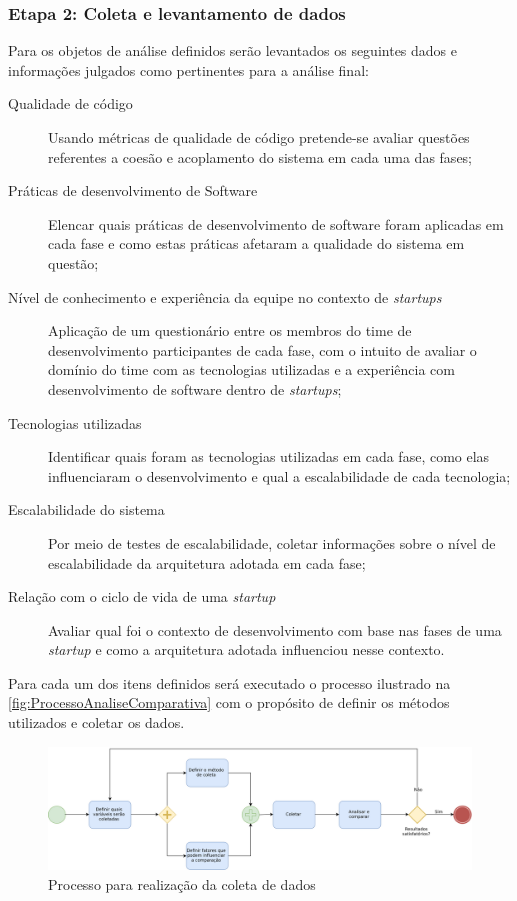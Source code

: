 \subsubsection{Etapa 2: Coleta e levantamento de dados}
\label{sec:Etapa2}

Para os objetos de análise definidos serão levantados os seguintes dados e informações
julgados como pertinentes para a análise final:

    \begin{description}
        \item [Qualidade de código] Usando métricas de qualidade de código pretende-se
        avaliar questões referentes a coesão e acoplamento do sistema em cada uma das
        fases;
        \item [Práticas de desenvolvimento de Software] Elencar quais práticas de
        desenvolvimento de software foram aplicadas em cada fase e como estas práticas
        afetaram a qualidade do sistema em questão;
        \item [Nível de conhecimento e experiência da equipe no contexto de \textit{startups}]
        Aplicação de um questionário entre os membros do time de desenvolvimento participantes
        de cada fase, com o intuito de avaliar o domínio do time com as tecnologias utilizadas
        e a experiência com desenvolvimento de software dentro de \textit{startups};
        \item [Tecnologias utilizadas] Identificar quais foram as tecnologias utilizadas em
        cada fase, como elas influenciaram o desenvolvimento e qual a escalabilidade de cada
        tecnologia;
        \item [Escalabilidade do sistema] Por meio de testes de escalabilidade, coletar
        informações sobre o nível de escalabilidade da arquitetura adotada em cada fase;
        \item [Relação com o ciclo de vida de uma \textit{startup}] Avaliar qual foi o
        contexto de desenvolvimento com base nas fases de uma \textit{startup} e como a
        arquitetura adotada influenciou nesse contexto.
    \end{description}

Para cada um dos itens definidos será executado o processo ilustrado na
\autoref{fig:ProcessoAnaliseComparativa} com o propósito de definir os métodos utilizados
e coletar os dados.

    \begin{figure}[h]
      \centering
      \includegraphics[keepaspectratio=true,scale=0.5]{figuras/metodologiaAnalise.eps}
      \caption{Processo para realização da coleta de dados\label{fig:ProcessoAnaliseComparativa}}
    \end{figure}

